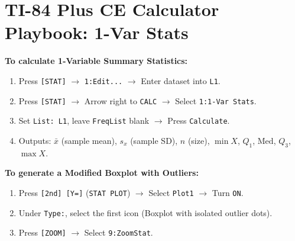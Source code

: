\documentclass[11pt,oneside,openany]{book}
\begin{document}
\section{TI-84 Plus CE Calculator Playbook: 1-Var Stats}
\begin{calculatorbox}
\textbf{To calculate 1-Variable Summary Statistics:}
\begin{enumerate}[leftmargin=1.2em]
  \item Press \texttt{[STAT]} $\rightarrow$ \texttt{1:Edit...} $\rightarrow$ Enter dataset into \texttt{L1}.
  \item Press \texttt{[STAT]} $\rightarrow$ Arrow right to \texttt{CALC} $\rightarrow$ Select \texttt{1:1-Var Stats}.
  \item Set \texttt{List: L1}, leave \texttt{FreqList} blank $\rightarrow$ Press \texttt{Calculate}.
  \item Outputs: $\bar{x}$ (sample mean), $s_x$ (sample SD), $n$ (size), $\min X$, $Q_1$, $\text{Med}$, $Q_3$, $\max X$.
\end{enumerate}
\textbf{To generate a Modified Boxplot with Outliers:}
\begin{enumerate}[leftmargin=1.2em]
  \item Press \texttt{[2nd] [Y=]} (\texttt{STAT PLOT}) $\rightarrow$ Select \texttt{Plot1} $\rightarrow$ Turn \texttt{ON}.
  \item Under \texttt{Type:}, select the first icon (Boxplot with isolated outlier dots).
  \item Press \texttt{[ZOOM]} $\rightarrow$ Select \texttt{9:ZoomStat}.
\end{enumerate}
\end{calculatorbox}
\end{document}
